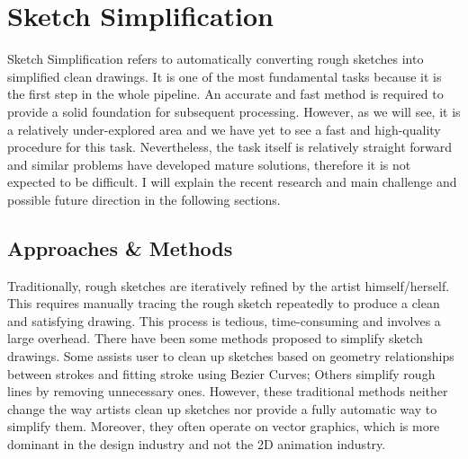 \chapter{Sketch Simplification}

Sketch Simplification refers to automatically converting rough sketches into simplified clean drawings. It is one of the most fundamental tasks because it is the first step in the whole pipeline. An accurate and fast method is required to provide a solid foundation for subsequent processing. However, as we will see, it is a relatively under-explored area and we have yet to see a fast and high-quality procedure for this task. Nevertheless, the task itself is relatively straight forward and similar problems have developed mature solutions, therefore it is not expected to be difficult. I will explain the recent research and main challenge and possible future direction in the following sections.

\label{chapterlabel4}
\section{Approaches \& Methods}
Traditionally, rough sketches are iteratively refined by the artist himself/herself. This requires manually tracing the rough sketch repeatedly to produce a clean and satisfying drawing. This process is tedious, time-consuming and involves a large overhead. There have been some methods proposed to simplify sketch drawings. Some assists user to clean up sketches based on geometry relationships between strokes\cite{fiserShipShapeDrawingBeautification2015} and fitting stroke using Bezier Curves\cite{baeILoveSketchAsnaturalaspossibleSketching2008}; Others simplify rough lines by removing unnecessary ones\cite{liuClosureawareSketchSimplification2015}. However, these traditional methods neither change the way artists clean up sketches nor provide a fully automatic way to simplify them. Moreover, they often operate on vector graphics, which is more dominant in the design industry and not the 2D animation industry.

